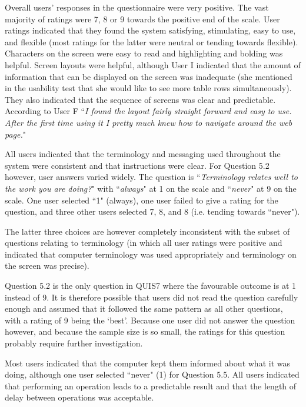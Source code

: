 Overall users' responses in the questionnaire were very positive. The vast majority of ratings were 7, 8 or 9 towards the positive end of the scale.  User ratings indicated that they found the system satisfying, stimulating, easy to use, and flexible (most ratings for the latter were neutral or tending towards flexible). Characters on the screen were easy to read and highlighting and bolding was helpful. Screen layouts were helpful, although User I indicated that the amount of information that can be displayed on the screen was inadequate (she mentioned in the usability test that she would like to see more table rows simultaneously). They also indicated that the sequence of screens was clear and predictable. According to User F ``\textit{I found the layout fairly straight forward and easy to use. After the first time using it I pretty much knew how to navigate around the web page.}"

All users indicated that the terminology and messaging used throughout the system were consistent and that instructions were clear. For Question 5.2 however, user answers varied widely. The question is ``\textit{Terminology relates well to the work you are doing?}"  with ``\textit{always}" at 1 on the scale and ``\textit{never}" at 9 on the scale. One user selected ``1" (always), one user failed to give a rating for the question, and three other users selected 7, 8, and 8 (i.e. tending towards ``never"). 

The latter three choices are however completely inconsistent with the subset of questions relating to terminology (in which all user ratings were positive and indicated that computer terminology was used appropriately and terminology on the screen was precise). 

Question 5.2 is the only question in QUIS7 where the favourable outcome is at 1 instead of 9. It is therefore possible that users did not read the question carefully enough and assumed that it followed the same pattern as all other questions, with a rating of 9 being the ‘best'. Because one user did not answer the question however, and because the sample size is so small, the ratings for this question probably require further investigation. 

Most users indicated that the computer kept them informed about what it was doing, although one user selected ``never" (1) for Question 5.5. All users indicated that performing an operation leads to a predictable result and that the length of delay between operations was acceptable. 

